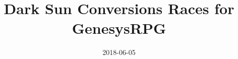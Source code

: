 \documentclass[a4paper, openright, 8pt]{report}
\title{Dark Sun Conversions Races for GenesysRPG}
\date{2018-06-05}
\begin{document}
\renewcommand{\constRacesShowImage}{false}
\renewcommand{\constReferItemQualities}{false}

\begin{multicols*}{2}










\end{multicols*}
\end{document}
